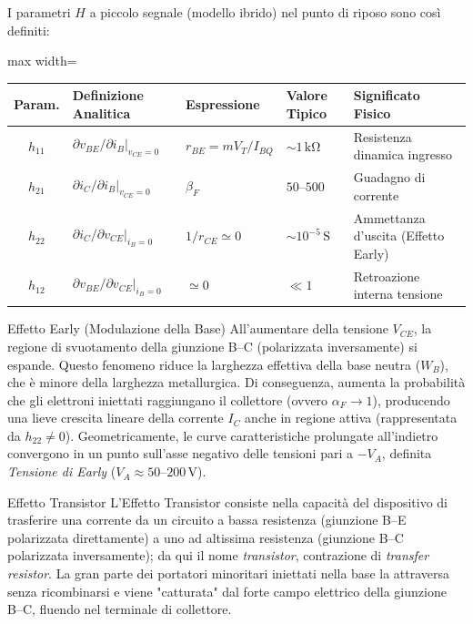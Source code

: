 I parametri $H$ a piccolo segnale (modello ibrido) nel punto di riposo sono così definiti:
\begin{center}
\begin{adjustbox}{max width=\textwidth}
\renewcommand{\arraystretch}{1.3}
\begin{tabular}{cllll}
    \hline
    \textbf{Param.} & \textbf{Definizione Analitica} & \textbf{Espressione} & \textbf{Valore Tipico} & \textbf{Significato Fisico} \\
    \hline
    $h_{11}$ & $\partial v_{BE}/\partial i_B|_{v_{CE}=0}$ & $r_{BE} = mV_T/I_{BQ}$ & $\sim\!1\,\mathrm{k\Omega}$ & Resistenza dinamica ingresso \\
    $h_{21}$ & $\partial i_C/\partial i_B|_{v_{CE}=0}$   & $\beta_F$              & $50$--$500$               & Guadagno di corrente \\
    $h_{22}$ & $\partial i_C/\partial v_{CE}|_{i_B=0}$   & $1/r_{CE} \simeq 0$    & $\sim\!10^{-5}\,\mathrm{S}$ & Ammettanza d'uscita (Effetto Early) \\
    $h_{12}$ & $\partial v_{BE}/\partial v_{CE}|_{i_B=0}$ & $\simeq 0$            & $\ll 1$                   & Retroazione interna tensione \\
    \hline
\end{tabular}
\end{adjustbox}
\end{center}

\vspace{0.3cm}
\begin{definizione}{Effetto Early (Modulazione della Base)}
    All'aumentare della tensione $V_{CE}$, la regione di svuotamento della giunzione B--C (polarizzata inversamente) si espande. Questo fenomeno riduce la larghezza effettiva della base neutra ($W_B$), che è minore della larghezza metallurgica. 
    Di conseguenza, aumenta la probabilità che gli elettroni iniettati raggiungano il collettore (ovvero $\alpha_F \to 1$), producendo una lieve crescita lineare della corrente $I_C$ anche in regione attiva (rappresentata da $h_{22} \neq 0$). 
    Geometricamente, le curve caratteristiche prolungate all'indietro convergono in un punto sull'asse negativo delle tensioni pari a $-V_A$, definita \emph{Tensione di Early} ($V_A \approx 50$--$200\,\mathrm{V}$).
\end{definizione}

\begin{definizione}{Effetto Transistor}
    L'Effetto Transistor consiste nella capacità del dispositivo di trasferire una corrente da un circuito a bassa resistenza (giunzione B--E polarizzata direttamente) a uno ad altissima resistenza (giunzione B--C polarizzata inversamente); da qui il nome \emph{transistor}, contrazione di \emph{transfer resistor}.
    La gran parte dei portatori minoritari iniettati nella base la attraversa senza ricombinarsi e viene "catturata" dal forte campo elettrico della giunzione B--C, fluendo nel terminale di collettore.
\end{definizione}

